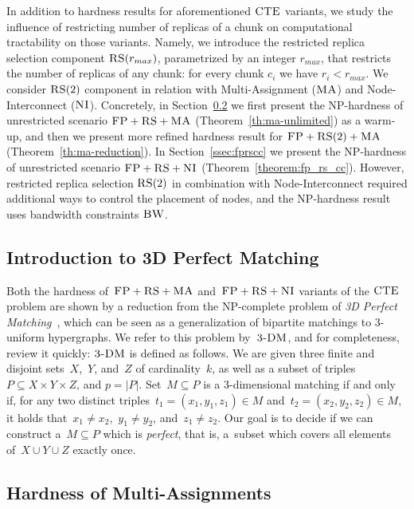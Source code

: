 In addition to hardness results for aforementioned $\textsc{CTE}$ variants, we study the influence of restricting number of replicas of a chunk on computational tractability on those variants.
Namely, we introduce the restricted replica selection component $\textsc{RS}(r_{max})$, parametrized by an integer $r_{max}$, that restricts the number of replicas of any chunk: for every chunk $c_i$ we have $r_i < r_{max}$.
We consider $\textsc{RS}(2)$ component in relation with Multi-Assignment ($\textsc{MA}$) and Node-Interconnect ($\textsc{NI}$).
Concretely, in Section~\ref{ssec:fprsma} we first present the NP-hardness of unrestricted scenario $\textsc{FP}+\textsc{RS}+\textsc{MA}$ (Theorem~\ref{th:ma-unlimited}) as a warm-up,
and then we present more refined hardness result for $\textsc{FP}+\textsc{RS}(2)+\textsc{MA}$ (Theorem~\ref{th:ma-reduction}). In Section~\ref{ssec:fprscc} we present the NP-hardness of unrestricted scenario $\textsc{FP}+\textsc{RS}+\textsc{NI}$ (Theorem~\ref{theorem:fp_rs_cc}).
However, restricted replica selection $\textsc{RS}(2)$ in combination with Node-Interconnect required additional ways to control the placement of nodes, and the NP-hardness result uses bandwidth constraints $\textsc{BW}$.

\subsection{Introduction to 3D Perfect Matching}
\label{sec:3dm_intro}

Both the hardness of~$\textsc{FP}+\textsc{RS}+\textsc{MA}$ and~$\textsc{FP}+\textsc{RS}+\textsc{NI}$ variants of the $\textsc{CTE}$ problem are shown by a reduction
from the NP-complete problem of \emph{3D Perfect Matching}~\cite{3dmatch},
which can be seen as a generalization of bipartite matchings to 3-uniform
hypergraphs. We refer to this problem by~$\textsc{3-DM}$, and for completeness,
review it quickly:
$\textsc{3-DM}$ is defined as follows. We are given three finite and disjoint
sets~$X$,~$Y$, and~$Z$ of cardinality~$k$, as well as a subset of triples~$P\subseteq
X \times Y \times Z$, and $p = |P|$.  Set~$M \subseteq P$ is a 3-dimensional matching
if and only if, for any two distinct triples~$t_1=(x_1, y_1, z_1) \in M$
and~$t_2=(x_2, y_2, z_2) \in M$, it holds that~$x_1\neq x_2$,~$y_1\neq
y_2$, and~$z_1\neq z_2$. Our goal is to decide if we can construct
a~$M \subseteq P$ which is \emph{perfect}, that is, a~subset which covers all
elements of~$X \cup Y \cup Z$ exactly once.


\subsection{Hardness of Multi-Assignments}\label{ssec:fprsma}

